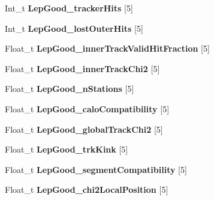 \begin{DoxyCompactItemize}
\item 
\hypertarget{classMiniTree_ab1ff5584f021342f35e3ec608de56313}{}\label{classMiniTree_ab1ff5584f021342f35e3ec608de56313} 
Int\+\_\+t {\bfseries Lep\+Good\+\_\+tracker\+Hits} \mbox{[}5\mbox{]}
\item 
\hypertarget{classMiniTree_a10ed16557b442b645778d1716863281e}{}\label{classMiniTree_a10ed16557b442b645778d1716863281e} 
Int\+\_\+t {\bfseries Lep\+Good\+\_\+lost\+Outer\+Hits} \mbox{[}5\mbox{]}
\item 
\hypertarget{classMiniTree_adc18fe5e78931c9b2980a50edd8a7c81}{}\label{classMiniTree_adc18fe5e78931c9b2980a50edd8a7c81} 
Float\+\_\+t {\bfseries Lep\+Good\+\_\+inner\+Track\+Valid\+Hit\+Fraction} \mbox{[}5\mbox{]}
\item 
\hypertarget{classMiniTree_aecc4d866b2e06141f90467b7f617197a}{}\label{classMiniTree_aecc4d866b2e06141f90467b7f617197a} 
Float\+\_\+t {\bfseries Lep\+Good\+\_\+inner\+Track\+Chi2} \mbox{[}5\mbox{]}
\item 
\hypertarget{classMiniTree_af781b2412ebfc25079380043e6e41817}{}\label{classMiniTree_af781b2412ebfc25079380043e6e41817} 
Float\+\_\+t {\bfseries Lep\+Good\+\_\+n\+Stations} \mbox{[}5\mbox{]}
\item 
\hypertarget{classMiniTree_a285a71c4e029d7e6d0d472c69f56f4ca}{}\label{classMiniTree_a285a71c4e029d7e6d0d472c69f56f4ca} 
Float\+\_\+t {\bfseries Lep\+Good\+\_\+calo\+Compatibility} \mbox{[}5\mbox{]}
\item 
\hypertarget{classMiniTree_a724d8a5e668f4c9967e6ea39725bc0ba}{}\label{classMiniTree_a724d8a5e668f4c9967e6ea39725bc0ba} 
Float\+\_\+t {\bfseries Lep\+Good\+\_\+global\+Track\+Chi2} \mbox{[}5\mbox{]}
\item 
\hypertarget{classMiniTree_a9af334bd9a851be512b00edab431919f}{}\label{classMiniTree_a9af334bd9a851be512b00edab431919f} 
Float\+\_\+t {\bfseries Lep\+Good\+\_\+trk\+Kink} \mbox{[}5\mbox{]}
\item 
\hypertarget{classMiniTree_a714d30fa1c92fcdc94a277360bebf8a7}{}\label{classMiniTree_a714d30fa1c92fcdc94a277360bebf8a7} 
Float\+\_\+t {\bfseries Lep\+Good\+\_\+segment\+Compatibility} \mbox{[}5\mbox{]}
\item 
\hypertarget{classMiniTree_a54773be798bc9dc3147bf7dafbcf399e}{}\label{classMiniTree_a54773be798bc9dc3147bf7dafbcf399e} 
Float\+\_\+t {\bfseries Lep\+Good\+\_\+chi2\+Local\+Position} \mbox{[}5\mbox{]}
\item 
\hypertarget{classMiniTree_a07b46047535185c252fbefaa036ec5de}{}\label{classMiniTree_a07b46047535185c252fbefaa036ec5de} 

\end{DoxyCompactItemize}
